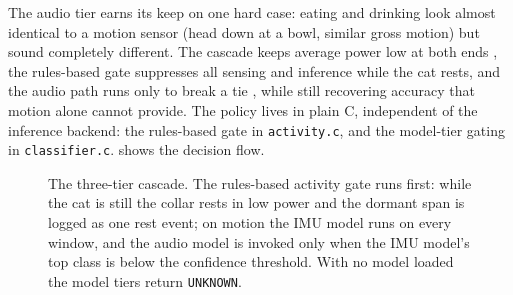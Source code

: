 The audio tier earns its keep on one hard case: eating and drinking look almost identical to a motion
sensor (head down at a bowl, similar gross motion) but sound completely different. The cascade keeps
average power low at both ends , the rules-based gate suppresses all sensing and inference while the
cat rests, and the audio path runs only to break a tie , while still recovering accuracy that motion
alone cannot provide. The policy lives in plain C, independent of the inference backend: the
rules-based gate in \texttt{activity.c}, and the model-tier gating in \texttt{classifier.c}.
 shows the decision flow.

\begin{figure}[ht]
  \centering
  \caption{The three-tier cascade. The rules-based activity gate runs first: while the cat is still
           the collar rests in low power and the dormant span is logged as one rest event; on motion
           the IMU model runs on every window, and the audio model is invoked only when the IMU
           model's top class is below the confidence threshold. With no model loaded the model tiers
           return \texttt{UNKNOWN}.}
  \label{fig:cascade}
\end{figure}

